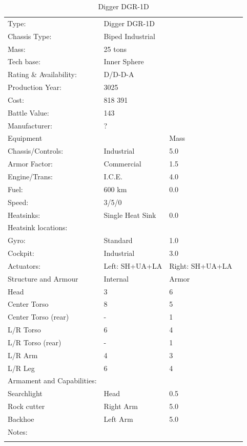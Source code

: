 \documentclass{tufte-book}
\begin{document}
\begin{table}
\begin{minipage}{\textwidth}
\begin{center}
\begin{tabular}{llll}
\toprule
Type: & Digger DGR-1D & \\
Chassis Type: & Biped Industrial & \\
Mass: & 25 tons & \\
Tech base: & Inner Sphere & \\
Rating \& Availability: & D/D-D-A & \\
Production Year: & 3025 & \\
Cost: & 818 391 & \\
Battle Value: & 143 & \\
Manufacturer: & ? & \\
Equipment & & Mass \\
\quad Chassis/Controls: & Industrial & 5.0 \\
\quad Armor Factor: & Commercial & 1.5 \\
\quad Engine/Trans: & I.C.E. & 4.0 \\
\quad Fuel: & 600 km & 0.0 \\
\quad Speed: & \multicolumn{2}{l}{3/5/0} \\
\quad Heatsinks: & Single Heat Sink & 0.0 \\
\quad Heatsink locations: &  & \\
\quad Gyro: & Standard & 1.0 \\
\quad Cockpit: & Industrial & 3.0 \\
\quad Actuators: & Left: SH+UA+LA & Right: SH+UA+LA \\
Structure and Armour & Internal & Armor \\
\quad Head & 3 & 6 \\
\quad Center Torso & 8 & 5 \\
\quad Center Torso (rear) & - & 1 \\
\quad L/R Torso & 6 & 4 \\
\quad L/R Torso (rear) & - & 1 \\
\quad L/R Arm & 4 & 3 \\
\quad L/R Leg & 6 & 4 \\

Armament and Capabilities: & & \\
\quad Searchlight & Head & 0.5 \\
\quad Rock cutter & Right Arm & 5.0 \\
\quad Backhoe & Left Arm & 5.0 \\

Notes: & & \\
\multicolumn{3}{l}{\quad } \\

\bottomrule
\end{tabular}
\end{center}
\end{minipage}
\caption{Digger DGR-1D}
\end{table}
\end{document}
